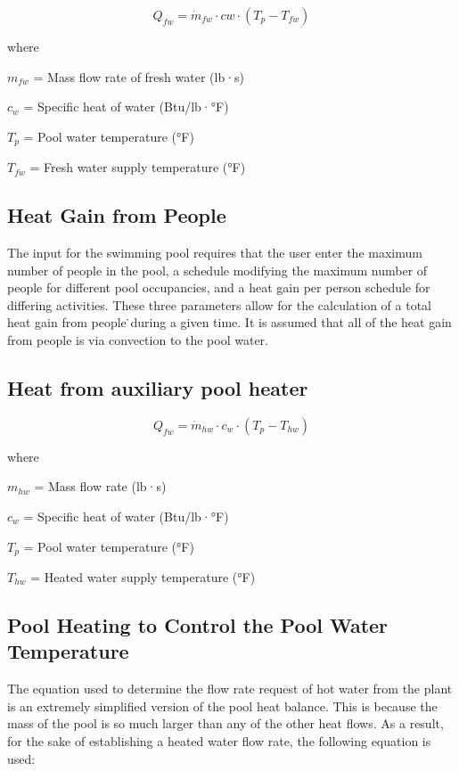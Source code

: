 \begin{equation}
Q_{fw} = \dot{m}_{fw} \cdot cw \cdot (T_p - T_{fw})
\end{equation}

where

\(m_{fw}\) = Mass flow rate of fresh water (lb·s)

\(c_w\) = Specific heat of water (Btu/lb·°F)

\(T_p\) = Pool water temperature (°F)

\(T_{fw}\) = Fresh water supply temperature (°F)

\subsection{Heat Gain from People}\label{heat-gain-from-people}

The input for the swimming pool requires that the user enter the maximum number of people in the pool, a schedule modifying the maximum number of people for different pool occupancies, and a heat gain per person schedule for differing activities. These three parameters allow for the calculation of a total heat gain from people ̇during a given time. It is assumed that all of the heat gain from people is via convection to the pool water.

\subsection{Heat from auxiliary pool heater}\label{heat-from-auxiliary-pool-heater}

\begin{equation}
Q_{fw} = \dot{m}_{hw} \cdot c_w \cdot (T_p - T_{hw})
\end{equation}

where

\(m_{hw}\) = Mass flow rate (lb·s)

\(c_w\) = Specific heat of water (Btu/lb·°F)

\(T_p\) = Pool water temperature (°F)

\(T_{hw}\) = Heated water supply temperature (°F)

\subsection{Pool Heating to Control the Pool Water Temperature}\label{pool-heating-to-control-the-pool-water-temperature}

The equation used to determine the flow rate request of hot water from the plant is an extremely simplified version of the pool heat balance. This is because the mass of the pool is so much larger than any of the other heat flows. As a result, for the sake of establishing a heated water flow rate, the following equation is used:

